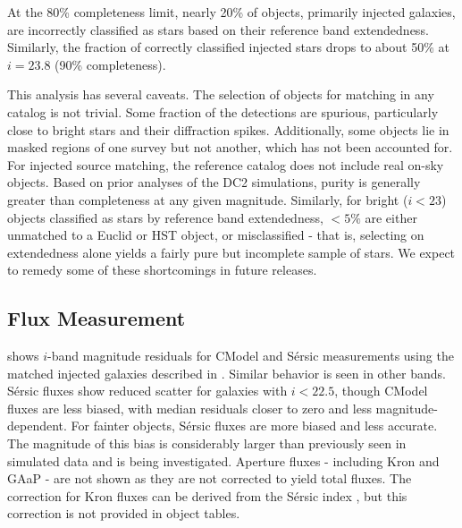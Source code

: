 At the 80\% completeness limit, nearly 20\% of objects, primarily injected galaxies, are incorrectly classified as stars based on their reference band extendedness.
Similarly, the fraction of correctly classified injected stars drops to about 50\% at $i=23.8$ (90\% completeness).

This analysis has several caveats.
The selection of objects for matching in any catalog is not trivial.
Some fraction of the detections are spurious, particularly close to bright stars and their diffraction spikes.
Additionally, some objects lie in masked regions of one survey but not another, which has not been accounted for. 
For injected source matching, the reference catalog does not include real on-sky objects.
Based on prior analyses of the \gls{DC2} simulations, purity is generally greater than completeness at any given magnitude.
Similarly, for bright ($i<23$) objects classified as stars by reference band extendedness, $<5\%$ are either unmatched to a Euclid or HST object, or misclassified - that is, selecting on extendedness alone yields a fairly pure but incomplete sample of stars.
We expect to remedy some of these shortcomings in future releases.

\subsection{Flux Measurement}
\label{ssec:fluxes}

 shows $i$-band magnitude residuals for CModel and S\'ersic measurements using the matched injected galaxies described in .
Similar behavior is seen in other bands.
S\'ersic fluxes show reduced scatter for galaxies with $i<22.5$, though CModel fluxes are less biased, with median residuals closer to zero and less magnitude-dependent.
For fainter objects, S\'ersic fluxes are more biased and less accurate.
The magnitude of this bias is considerably larger than previously seen in simulated data and is being investigated.
Aperture fluxes - including Kron and \gls{GAaP} - are not shown as they are not corrected to yield total fluxes.
The correction for Kron fluxes can be derived from the S\'ersic index \citep{2005PASA...22..118G}, but this correction is not provided in object tables.

